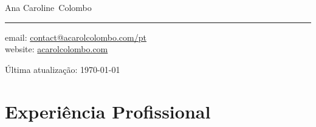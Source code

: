 \documentclass[11pt, a4paper]{article}
\makeatletter
\newcommand{\FirstName}{Ana Caroline}
\newcommand{\LastName}{Colombo}
\newcommand{\MyName}{\FirstName\ \LastName}
\newcommand{\Email}{contact@acarolcolombo.com/pt}
\newcommand{\Website}{acarolcolombo.com}
\makeatother
\begin{document}
\thispagestyle{empty}


{\fontsize{20pt}{0}\selectfont \MyName}	\\[0.3cm]
\rule{\textwidth}{0.2pt}
\begin{minipage}[t]{0.595\textwidth}
	 email: \href{mailto:\Email}{\Email}
    \\
    website: \href{https://www.\Website}{\Website}
\end{minipage}
\begin{minipage}[t]{0.405\textwidth}
  \begin{flushright}
  Última atualização: \monthyear\today
  \\
  \end{flushright}
\end{minipage}

\section*{Experiência Profissional}
\end{document}
